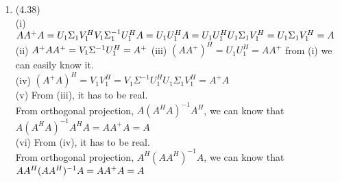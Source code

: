 \documentclass[letterpaper,12pt]{article}
\theoremstyle{definition}
\begin{document}
\begin{enumerate}
 	\item (4.38) \\
(i) $AA^+A = U_1\Sigma_1V_1^HV_1\Sigma_1^{-1}U_1^HA = U_1U_1^HA = U_1U_1^HU_1\Sigma_1V_1^H = U_1\Sigma_1V_1^H =A \\$
(ii) $A^+AA^+=V_1\Sigma^{-1}U_1^H = A^+\\$
(iii) $(AA^+)^H=U_1U_1^H=AA^+$ from (i) we can easily know it.\\
(iv) $ (A^+A)^H = V_1V_1^H = V_1\Sigma^{-1}U_1^HU_1\Sigma_1V_1^H = A^+A $\\
(v) From (iii), it has to be real.\\
From orthogonal projection, $A(A^HA)^{-1}A^H$, we can know that $A(A^HA)^{-1}A^HA = AA^+A = A$ \\
(vi) From (iv), it has to be real.\\
From orthogonal projection, $A^H(AA^H)^{-1}A$, we can know that $AA^H(AA^H)^{-1}A = AA^+A = A\\
$






















\end{enumerate}

\vspace{25mm}


\end{document}
